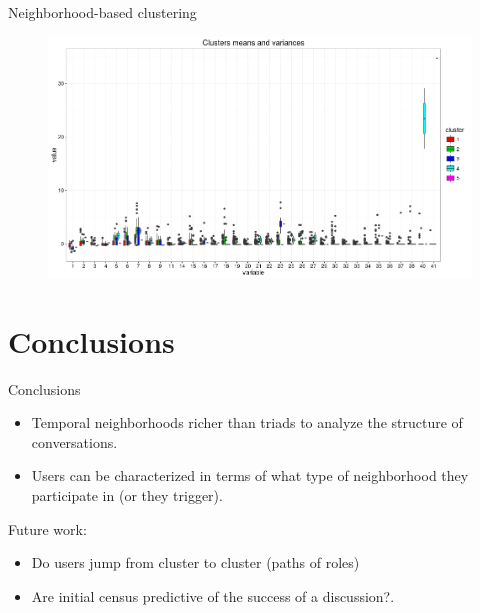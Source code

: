 \documentclass{beamer}
\begin{document}
\begin{frame}{Neighborhood-based clustering }
	\begin{figure}
		\centering
		\includegraphics[width=1\textwidth]{whiskers}	
	\end{figure}
\end{frame}



\section{Conclusions}
\begin{frame}{Conclusions}
	\begin{itemize}
			\item Temporal neighborhoods richer than triads to analyze the structure of conversations.
			\item Users can be characterized in terms of what type of neighborhood they participate in (or they trigger).
	\end{itemize}
	Future work:
	\begin{itemize}
		\item Do users jump from cluster to cluster (paths of roles)
		\item Are initial census predictive of the success of a discussion?.
	\end{itemize}	

\end{frame}
\end{document}
